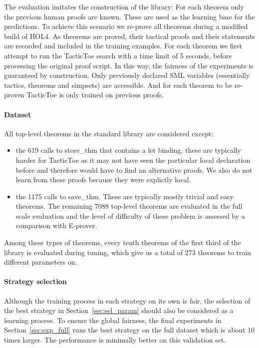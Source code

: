 \documentclass[runningheads,a4paper,draft]{svjour3}
\def\holfour{\textsf{HOL4}\xspace}
\def\eprover{\textsf{E-prover}\xspace}
\def\sml{\textsf{SML}\xspace}
\def\tactictoe{\textsf{TacticToe}\xspace}
\begin{document}
The evaluation imitates the construction of the library: For each theorem only 
the previous human proofs are known. These are used as the learning base for 
the predictions.
To achieve this scenario we re-prove all theorems during a modified build of 
\holfour.
As theorems are proved, their tactical proofs and their statements are recorded 
and included in the 
training examples.
For each theorem we first attempt to run the \tactictoe search with a time 
limit of 5 seconds,
before processing the original proof script.
In this way, the fairness of the
experiments is guaranteed by construction. 
Only previously declared \sml 
variables (essentially tactics, theorems and simpsets) are accessible. 
And for each theorem to be re-proven \tactictoe is only trained on previous 
proofs.



\paragraph{Dataset}

All top-level theorems in the standard library are considered except:
\begin{itemize}
\item the 619 calls to store\_thm that contains a let binding, these are 
typically 
harder for \tactictoe as it may not have seen the particular local declaration 
before and therefore would have to find an alternative proofs. We also do not 
learn from these proofs because they were explictly local.
\item the 1175 calls to save\_thm. These are typically mostly trivial and easy 
theorems.
The remaining 7088 top-level theorems are evaluated in the full scale 
evaluation and the level of difficulty of these problem is assessed by a 
comparison with \eprover.
\end{itemize}

Among these types of theorems, every tenth theorems of the first third of the 
library is evaluated during tuning, which give us a total of 273 theorems to 
train different parameters on.

\paragraph{Strategy selection}
Although the training process in each strategy on its own is fair, the 
selection of the 
best strategy in Section~\ref{sec:sel_param} should also be considered as a 
learning 
process. To ensure the global fairness, the final experiments in 
Section~\ref{sec:exp_full} 
runs the best strategy on the full dataset which is about 10 times larger. The
performance is minimally better on this validation set.
\end{document}
